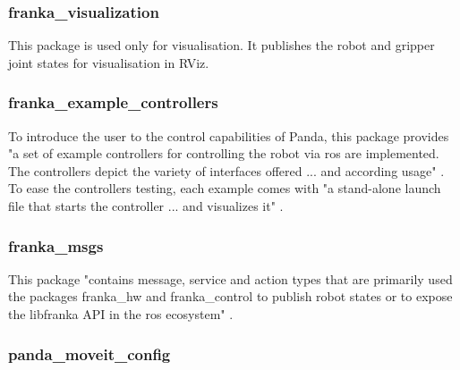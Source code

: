 \subsubsection*{franka\_visualization}
\label{subsubsec:ros_setup_robotic_system_integration_ros_franka_ros_franka_visualization}

This package is used only for visualisation. It publishes the robot and gripper joint states for visualisation in RViz.


\subsubsection*{franka\_example\_controllers}
\label{subsubsec:ros_setup_robotic_system_integration_ros_franka_ros_franka_example_controllers}

To introduce the user to the control capabilities of Panda, this package provides "a set of example controllers for controlling the robot via \gls{ros} are implemented. The controllers depict the variety of interfaces offered ... and according usage" \cite{FrankaEmikaGmbH_fci_documentation}. To ease the controllers testing, each example comes with "a stand-alone launch file that starts the controller ... and visualizes it" \cite{FrankaEmikaGmbH_fci_documentation}.


\subsubsection*{franka\_msgs}
\label{subsubsec:ros_setup_robotic_system_integration_ros_franka_ros_franka_msgs}

This package "contains message, service and action types that are primarily used the packages franka\_hw and franka\_control to publish robot states or to expose the libfranka API in the \gls{ros} ecosystem" \cite{FrankaEmikaGmbH_fci_documentation}.


\subsubsection*{panda\_moveit\_config}
\label{subsubsec:ros_setup_robotic_system_integration_ros_franka_ros_panda_moveit_config}

